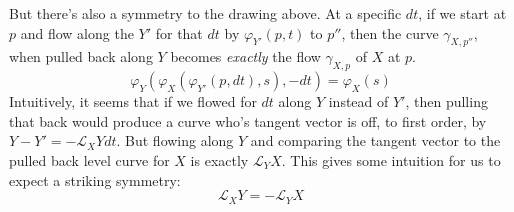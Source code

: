 	But there's also a symmetry to the drawing above. At a specific $dt$, if we start at $p$ and flow along the $Y'$ for that $dt$ by $\varphi_{Y'}(p, t)$ to $p''$, then the curve $\gamma_{X, p''}$, when pulled back along $Y$ becomes \emph{exactly} the flow $\gamma_{X,p}$ of $X$ at $p$.
	\begin{equation}
		\varphi_Y (\varphi_X (\varphi_{Y'} (p, dt), s), -dt) =  \varphi_X(s)
	\end{equation}
	Intuitively, it seems that if we flowed for $dt$ along $Y$ instead of $Y'$, then pulling that back would produce a curve who's tangent vector is off, to first order, by $Y-Y' = - \mathcal L_X Y dt$. But flowing along $Y$ and comparing the tangent vector to the pulled back level curve for $X$ is exactly $\mathcal L_Y X$. This gives some intuition for us to expect a striking symmetry:
	\begin{equation}
		\mathcal L_X Y = - \mathcal L_Y X
	\end{equation}

